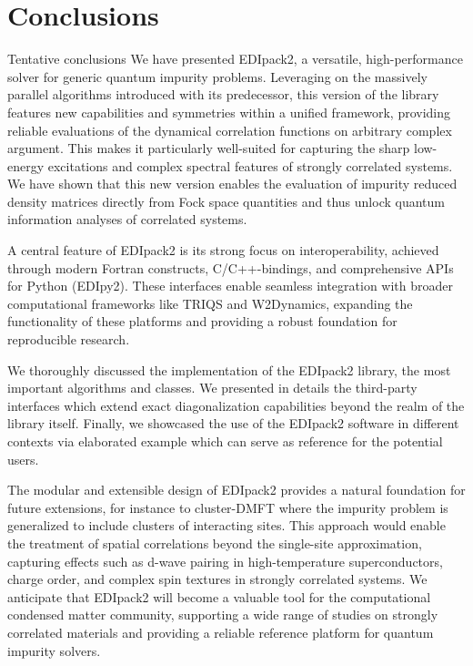 \documentclass[preprint,3p,10pt]{elsarticle}
\begin{document}
\section{Conclusions}
{\color{red} Tentative conclusions}
We have presented EDIpack2, a versatile, high-performance solver for
generic quantum impurity problems. Leveraging on the massively
parallel algorithms introduced with its predecessor, this version of
the library features new capabilities and symmetries within a unified
framework, providing reliable evaluations of the dynamical correlation
functions on arbitrary complex argument.
This makes it particularly well-suited for capturing the sharp
low-energy excitations and complex spectral features of strongly
correlated systems. We have shown that this new version enables the evaluation of impurity
reduced density matrices directly from Fock space quantities and thus unlock 
quantum information analyses of correlated systems.  

A central feature of EDIpack2 is its strong focus on interoperability,
achieved through modern Fortran constructs, C/C++-bindings, and
comprehensive APIs for Python (EDIpy2). 
These interfaces enable seamless integration with broader
computational frameworks like TRIQS and W2Dynamics, expanding the
functionality of these platforms and providing a robust foundation for
reproducible research.

We thoroughly discussed the implementation of the EDIpack2 library, the
most important algorithms and classes. We presented in
details the third-party interfaces which extend exact diagonalization
capabilities beyond the realm of the library itself.   
Finally, we showcased the use of the EDIpack2 software in different
contexts via elaborated example which can serve as reference for the
potential users. 

The modular and extensible design of EDIpack2 provides a
natural foundation for future extensions, for instance to cluster-DMFT where the
impurity problem is generalized to include clusters of interacting
sites. This approach would enable the treatment of spatial
correlations beyond the single-site approximation, capturing effects
such as d-wave pairing in high-temperature superconductors, charge
order, and complex spin textures in strongly correlated systems.
We anticipate that EDIpack2 will become a valuable tool for the
computational condensed matter community, supporting a wide range of
studies on strongly correlated materials and providing a reliable
reference platform for quantum impurity solvers.
\end{document}
